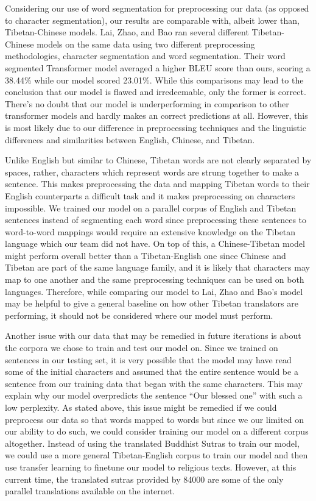 \documentclass[letterpaper, 10 pt, conference]{ieeeconf}  %
\begin{document}
Considering our use of word segmentation for preprocessing our data (as opposed to character segmentation), our results are comparable with, albeit lower than, Tibetan-Chinese models. Lai, Zhao, and Bao ran several different Tibetan-Chinese models on the same data using two different preprocessing methodologies, character segmentation and word segmentation. Their word segmented Transformer model averaged a higher BLEU score than ours, scoring a 38.44\% while our model scored 23.01\%. While this comparisons may lead to the conclusion that our model is flawed and irredeemable, only the former is correct. There’s no doubt that our model is underperforming in comparison to other transformer models and hardly makes an correct predictions at all. However, this is most likely due to our difference in preprocessing techniques and the linguistic differences and similarities between English, Chinese, and Tibetan. 

Unlike English but similar to Chinese, Tibetan words are not clearly separated by spaces, rather, characters which represent words are strung together to make a sentence. This makes preprocessing the data and mapping Tibetan words to their English counterparts a difficult task and it makes preprocessing on characters impossible. We trained our model on a parallel corpus of English and Tibetan sentences instead of segmenting each word since preprocessing these sentences to word-to-word mappings would require an extensive knowledge on the Tibetan language which our team did not have. On top of this, a Chinese-Tibetan model might perform overall better than a Tibetan-English one since Chinese and Tibetan are part of the same language family, and it is likely that characters may map to one another and the same preprocessing techniques can be used on both languages. Therefore, while comparing our model to Lai, Zhao and Bao’s model may be helpful to give a general baseline on how other Tibetan translators are performing, it should not be considered where our model must perform.

Another issue with our data that may be remedied in future iterations is about the corpora we chose to train and test our model on. Since we trained on sentences in our testing set, it is very possible that the model may have read some of the initial characters and assumed that the entire sentence would be a sentence from our training data that began with the same characters. This may explain why our model overpredicts the sentence “Our blessed one” with such a low perplexity. As stated above, this issue might be remedied if we could preprocess our data so that words mapped to words but since we our limited on our ability to do such, we could consider training our model on a different corpus altogether. Instead of using the translated Buddhist Sutras to train our model, we could use a more general Tibetan-English corpus to train our model and then use transfer learning to finetune our model to religious texts. However, at this current time, the translated sutras provided by 84000 are some of the only parallel translations available on the internet.
\end{document}
